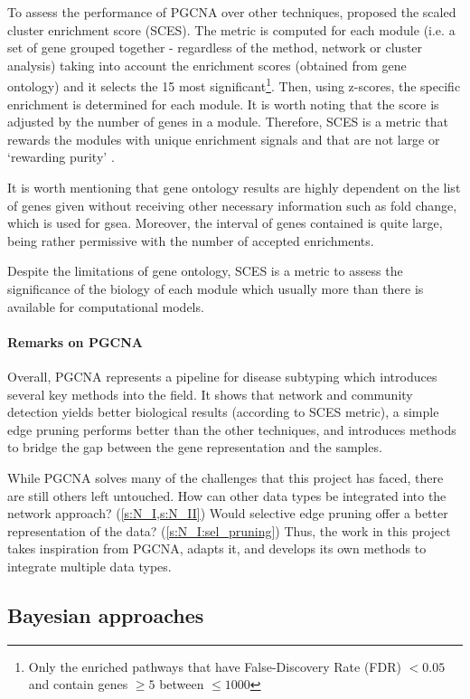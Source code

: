 To assess the performance of PGCNA over other techniques, \citet{Care2019-ij} proposed the scaled cluster enrichment score (SCES). The metric is computed for each module (i.e. a set of gene grouped together - regardless of the method, network or cluster analysis) taking into account the enrichment scores (obtained from gene ontology) and it selects the 15 most significant\footnote{Only the enriched pathways that have False-Discovery Rate (FDR) $<0.05$ and contain genes $\geq5$ between $\leq1000$}. Then, using z-scores, the specific enrichment is determined for each module. It is worth noting that the score is adjusted by the number of genes in a module. Therefore, SCES is a metric that rewards the modules with unique enrichment signals and that are not large or ‘rewarding purity' \citep{Care2019-ij}.

It is worth mentioning that gene ontology results are highly dependent on the list of genes given without receiving other necessary information such as fold change, which is used for \acrlong{gsea}. Moreover, the interval of genes contained is quite large, being rather permissive with the number of accepted enrichments.

Despite the limitations of gene ontology, SCES is a metric to assess the significance of the biology of each module which usually more than there is available for computational models.


\paragraph*{Remarks on PGCNA}

Overall, PGCNA represents a pipeline for disease subtyping which introduces several key methods into the field. It shows that network and community detection yields better biological results (according to SCES metric), a simple edge pruning performs better than the other techniques, and introduces methods to bridge the gap between the gene representation and the samples.

While PGCNA solves many of the challenges that this project has faced, there are still others left untouched. How can other data types be integrated into the network approach? (\cref{s:N_I,s:N_II}) Would selective edge pruning offer a better representation of the data? (\cref{s:N_I:sel_pruning}) Thus, the work in this project takes inspiration from PGCNA, adapts it, and develops its own methods to integrate multiple data types.

\subsection{Bayesian approaches} \label{s:lit:bayesian}

